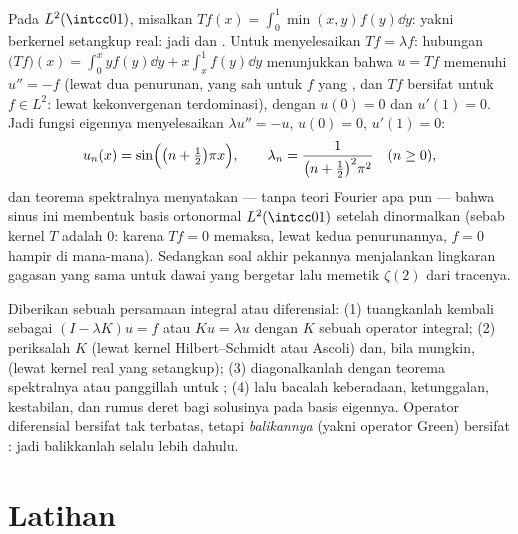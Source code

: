 \begin{example}\label{ex:b3:spectral:minxy}
Pada $L^2(\intcc01)$, misalkan $Tf(x) = \int_0^1\min(x, y)f(y)\dd y$:
yakni  berkernel setangkup real:
jadi  dan . Untuk menyelesaikan $Tf = \lambda f$:
hubungan $\bigl(Tf\bigr)(x) = \int_0^xyf(y)\dd y +
x\int_x^1f(y)\dd y$ menunjukkan bahwa $u = Tf$ memenuhi $u'' = -f$ (lewat dua
penurunan, yang sah untuk $f$ yang , dan $Tf$ bersifat
 untuk $f \in L^2$: lewat kekonvergenan terdominasi), dengan $u(0)
= 0$ dan $u'(1) = 0$. Jadi fungsi eigennya menyelesaikan $\lambda u'' =
-u$, $u(0) = 0$, $u'(1) = 0$:
\[
u_n(x) = \sin\Bigl(\bigl(n + \tfrac12\bigr)\pi x\Bigr),
\qquad
\lambda_n = \frac{1}{\bigl(n + \frac12\bigr)^2\pi^2}
\quad (n \geq 0),
\]
dan teorema spektralnya menyatakan --- tanpa teori Fourier apa pun ---
bahwa sinus ini membentuk basis ortonormal $L^2(\intcc01)$
setelah dinormalkan (sebab kernel $T$ adalah $0$: karena $Tf = 0$
memaksa, lewat kedua penurunannya, $f = 0$ hampir di mana-mana). Sedangkan
soal akhir pekannya menjalankan lingkaran gagasan yang sama untuk
dawai yang bergetar lalu memetik $\zeta(2)$ dari tracenya.
\end{example}

\begin{method}\label{met:b3:spectral:method}
Diberikan sebuah persamaan integral atau diferensial: (1) tuangkanlah kembali sebagai
$(I - \lambda K)u = f$ atau $Ku = \lambda u$ dengan $K$ sebuah
operator integral; (2) periksalah $K$  (lewat kernel Hilbert--Schmidt
atau Ascoli) dan, bila mungkin,  (lewat kernel real
yang setangkup); (3) diagonalkanlah dengan teorema spektralnya atau
panggillah  untuk ; (4) lalu bacalah
keberadaan, ketunggalan, kestabilan, dan rumus deret bagi
solusinya pada basis eigennya. Operator diferensial bersifat tak
terbatas, tetapi \emph{balikannya} (yakni operator Green) bersifat
: jadi balikkanlah selalu lebih dahulu.
\end{method}

\section{Latihan}


